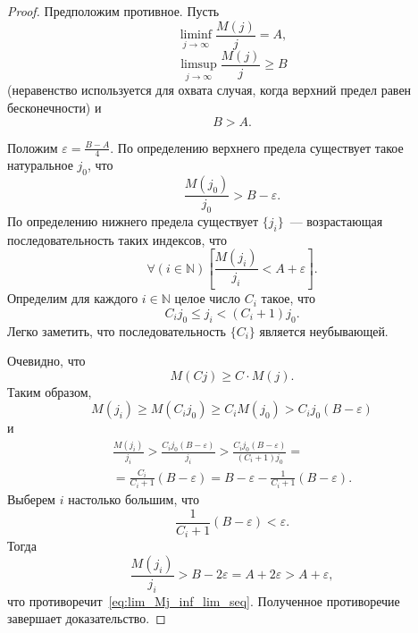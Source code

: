 \documentclass[a4paper,14pt]{article} %
\theoremstyle{plain}
\begin{document}
\begin{proof}
	Предположим противное.
	Пусть
	\begin{equation}
		\liminf_{j\to\infty}\frac{M(j)}{j} = A,
	\end{equation}
	\begin{equation}
		\limsup_{j\to\infty}\frac{M(j)}{j} \geq B
	\end{equation}
	(неравенство используется для охвата случая, когда верхний предел равен бесконечности)
	и
	\begin{equation}
		B > A
		.
	\end{equation}

	Положим $\varepsilon = \frac{B-A}{4}$.
	По определению верхнего предела существует такое натуральное $j_0$,
	что
	\begin{equation}
		\frac{M(j_0)}{j_0} > B - \varepsilon
		.
	\end{equation}
	По определению нижнего предела существует $\{j_i\}$~--- возрастающая последовательность таких индексов, что
	\begin{equation}
		\label{eq:lim_Mj_inf_lim_seq}
		\forall(i\in\mathbb{N})\left[ \frac{M(j_i)}{j_i} < A + \varepsilon \right]
		.
	\end{equation}
	Определим для каждого $i\in\mathbb{N}$ целое число $C_i$ такое, что
	\begin{equation}
		\label{eq:lim_Mj_inf_lim_Ci}
		C_i j_0 \leq j_i < (C_i+1)j_0
		.
	\end{equation}
	Легко заметить, что последовательность $\{C_i\}$ является неубывающей.

	Очевидно, что
	\begin{equation}
		M(Cj) \geq C \cdot M(j)
		.
	\end{equation}
	Таким образом,
	\begin{equation}
		M(j_i) \geq M(C_i j_0) \geq C_i M(j_0) > C_i j_0 (B-\varepsilon)
	\end{equation}
	и
	\begin{multline}
		\frac{M(j_i)}{j_i} > \frac{C_i j_0 (B-\varepsilon)}{j_i}
		> \frac{C_i j_0 (B-\varepsilon)}{(C_i+1)j_0}
		=
		\\=
		\frac{C_i}{C_i+1}(B-\varepsilon)
		= B-\varepsilon - \frac{1}{C_i+1}(B-\varepsilon)
		.
	\end{multline}
	Выберем $i$ настолько большим, что
	\begin{equation}
		\frac{1}{C_i+1}(B-\varepsilon) < \varepsilon
		.
	\end{equation}
	Тогда
	\begin{equation}
		\frac{M(j_i)}{j_i} > B - 2 \varepsilon = A + 2 \varepsilon > A + \varepsilon
		,
	\end{equation}
	что противоречит~\eqref{eq:lim_Mj_inf_lim_seq}.
	Полученное противоречие завершает доказательство.
\end{proof}
\end{document}
